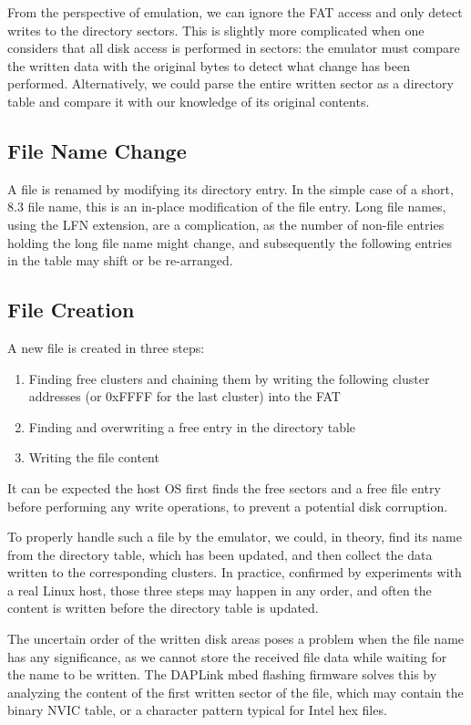 From the perspective of emulation, we can ignore the \gls{FAT} access and only detect writes to the directory sectors. This is slightly more complicated when one considers that all disk access is performed in sectors: the emulator must compare the written data with the original bytes to detect what change has been performed. Alternatively, we could parse the entire written sector as a directory table and compare it with our knowledge of its original contents.

\subsection{File Name Change}

A file is renamed by modifying its directory entry. In the simple case of a short, 8.3 file name, this is an in-place modification of the file entry. Long file names, using the \gls{LFN} extension, are a complication, as the number of non-file entries holding the long file name might change, and subsequently the following entries in the table may shift or be re-arranged.

\subsection{File Creation}

A new file is created in three steps:

\begin{enumerate}
	\item Finding free clusters and chaining them by writing the following cluster addresses (or 0xFFFF for the last cluster) into the \gls{FAT}
	\item Finding and overwriting a free entry in the directory table
	\item Writing the file content
\end{enumerate}

It can be expected the host \gls{OS} first finds the free sectors and a free file entry before performing any write operations, to prevent a potential disk corruption.

To properly handle such a file by the emulator, we could, in theory, find its name from the directory table, which has been updated, and then collect the data written to the corresponding clusters. In practice, confirmed by experiments with a real Linux host, those three steps may happen in any order, and often the content is written before the directory table is updated.

The uncertain order of the written disk areas poses a problem when the file name has any significance, as we cannot store the received file data while waiting for the name to be written. The DAPLink mbed flashing firmware solves this by analyzing the content of the first written sector of the file, which may contain the binary \gls{NVIC} table, or a character pattern typical for Intel hex files.

